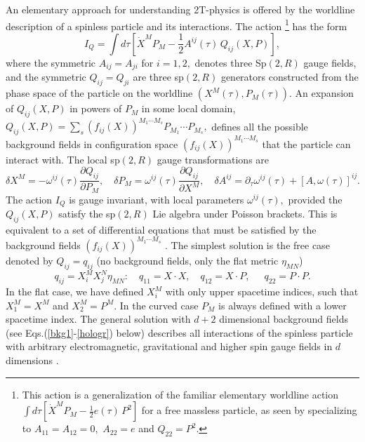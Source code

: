 \documentclass[a4paper,12pt]{article}
\begin{document}
An elementary approach for understanding 2T-physics is offered by
the worldline description of a spinless particle and its
interactions. The action
\footnote{%
This action is a generalization of the familiar elementary
worldline action $ \int d\tau \left[
\dot{X}^{M}P_{M}-{\frac{1}{2}}e\left( \tau \right) \,P^{2}
\right] $ for a free massless particle, as seen by specializing to $%
A_{11}=A_{12}=0,$ $A_{22}=e$ and $Q_{22}=P^{2}.$} has the form \cite{emgrav}
\cite{highspin}
\begin{equation}
I_{Q}=\int d\tau \left[ \dot{X}^{M}P_{M}-{\frac{1}{2}}A^{ij}\left( \tau
\right) \,Q_{ij}(X,P)\right] ,
\end{equation}
where the symmetric $A_{ij}=A_{ji}$ for $i=1,2,$ denotes three
Sp$\left( 2,R\right) $ gauge fields, and the symmetric
$Q_{ij}=Q_{ji}$ are three sp$ \left( 2,R\right) $ generators
constructed from the phase space of the particle on the worldline
$\left( X^{M}\left( \tau \right) ,P_{M}\left( \tau \right) \right)
$. An expansion of $Q_{ij}(X,P)$ in powers of $P_{M}$ in some
local domain, $Q_{ij}(X,P)=\sum_{s}\left( f_{ij}\left( X\right)
\right) ^{M_{1}\cdots M_{s}}P_{M_{1}}\cdots P_{M_{s}},$ defines
all the possible background fields in configuration space $\left(
f_{ij}\left( X\right) \right) ^{M_{1}\cdots M_{s}}$ that the
particle can interact with. The local sp$\left( 2,R\right) $ gauge
transformations are
\begin{equation}
\delta X^{M}=-\omega ^{ij}\left( \tau \right) \frac{\partial
Q_{ij}}{\partial P_{M}},\quad \delta P_{M}=\omega ^{ij}\left( \tau
\right) \frac{\partial Q_{ij}}{\partial X^{M}},\quad \delta
A^{ij}=\partial _{\tau }\omega ^{ij}\left( \tau \right) +\left[
A,\omega \left( \tau \right) \right] ^{ij}. \label{deltaXP}
\end{equation}
The action $I_{Q}$ is gauge invariant, with local parameters $\omega
^{ij}\left( \tau \right) ,$ provided the $Q_{ij}\left( X,P\right) $ satisfy
the sp$\left( 2,R\right) $ Lie algebra under Poisson brackets. This is
equivalent to a set of differential equations that must be satisfied by the
background fields $\left( f_{ij}\left( X\right) \right) ^{M_{1}\cdots M_{s}}$
\cite{emgrav}\cite{highspin}. The simplest solution is the free case denoted
by $Q_{ij}=q_{ij}$ (no background fields, only the flat metric $\eta _{MN}$)
\begin{equation}
q_{ij}=X_{i}^{M}X_{j}^{N}\eta _{MN}:\quad q_{11}=X\cdot X,\quad
q_{12}=X\cdot P,\quad \ \ q_{22}=P\cdot P.  \label{free}
\end{equation}
In the flat case, we have defined $X^M_i$ with only upper
spacetime indices, such that $X^M_1=X^M$ and $X^M_2=P^M$. In the
curved case $P_M$ is always defined with a lower spacetime index.
The general solution with $d+2$ dimensional background fields (see
Eqs.(\ref{bkg1}-\ref{hologr}) below) describes all interactions
of the spinless particle with arbitrary electromagnetic,
gravitational and higher spin gauge fields in $d$ dimensions
\cite{highspin}.
\end{document}
